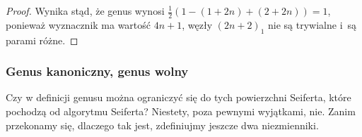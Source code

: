\begin{proof}
\begin{comment}
            \draw[semithick] (0,-10) circle (3);

            \draw[semithick] (-30, 15) to [out=left, in=up]   (-45, 0);
            \draw[semithick] (-30,-15) to [out=left, in=down] (-45, 0);
            \draw[semithick] (-30,  5) to [out=left, in=up]   (-35, 0);
            \draw[semithick] (-30, -5) to [out=left, in=down] (-35, 0);

            \draw[semithick] (30, 15) to [out=right, in=up]   (45,0);
            \draw[semithick] (30,-15) to [out=right, in=down] (45,0);
            \draw[semithick] (30,  5) to [out=right, in=up]   (35,0);
            \draw[semithick] (30, -5) to [out=right, in=down] (35,0);

            \draw[semithick] (-30, 15) to [out=right, in=up] (-20,10);
            \draw[semithick] (-30,  5) to [out=right, in=down] (-20,10);

            \draw[semithick] (30, 15) to [out=left, in=up] (20,10);
            \draw[semithick] (30,  5) to [out=left, in=down] (20,10);

            \draw[semithick] (-10, 10) circle (5);
            \draw[semithick] (10,  10) circle (5);
        \end{tikzpicture}
    \]
\end{comment}
    Wynika stąd, że genus wynosi $\frac 12 (1 - (1+2n) + (2+2n)) = 1$, ponieważ wyznacznik ma wartość $4n+1$,
    węzły $(2n+2)_1$ nie są trywialne i~są parami różne.
\end{proof}































\subsubsection{Genus kanoniczny, genus wolny}

Czy w definicji genusu można ograniczyć się do tych powierzchni Seiferta, które pochodzą od algorytmu Seiferta?
Niestety, poza pewnymi wyjątkami, nie.
Zanim przekonamy się, dlaczego tak jest, zdefiniujmy jeszcze dwa niezmienniki.

